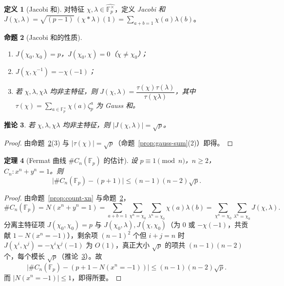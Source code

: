 \documentclass{article}
\theoremstyle{plain}
\newtheorem{thm}{定理}[section]
\newtheorem{cor}[thm]{推论}
\newtheorem{prop}[thm]{命题}
\theoremstyle{definition}
\newtheorem{defn}[thm]{定义}
\theoremstyle{remark}
\begin{document}
\begin{defn}[Jacobi 和]
  对特征 $\chi,\lambda\in\widehat{\mathbb{F}_p^\times}$，定义 \emph{Jacobi 和} $J(\chi,\lambda)=\sqrt{(p-1)}\,(\chi*\lambda)(1)=\sum_{a+b=1}\chi(a)\lambda(b)$。
\end{defn}

\begin{prop}[Jacobi 和的性质]\label{prop:jacobi}
  \begin{enumerate}[(1)]
    \item $J(\chi_0,\chi_0)=p$，$J(\chi_0,\chi)=0$（$\chi\ne\chi_0$）；
    \item $J(\chi,\chi^{-1})=-\chi(-1)$；
    \item 若 $\chi,\lambda,\chi\lambda$ 均非主特征，则 $J(\chi,\lambda)=\dfrac{\tau(\chi)\tau(\lambda)}{\tau(\chi\lambda)}$，其中 $\tau(\chi)=\sum_{a\in\mathbb{F}_p^\times}\chi(a)\zeta_p^a$ 为 Gauss 和。
  \end{enumerate}
\end{prop}

\begin{cor}\label{cor:jacobi-mod}
  若 $\chi,\lambda,\chi\lambda$ 均非主特征，则 $|J(\chi,\lambda)|=\sqrt p$。
\end{cor}

\begin{proof}
  由命题~\ref{prop:jacobi}(3) 与 $|\tau(\chi)|=\sqrt p$（命题~\ref{prop:gauss-sum}(2)）即得。
\end{proof}

\begin{thm}[Fermat 曲线 $\#\!C_n(\mathbb{F}_p)$ 的估计]\label{thm:fermat-fp}
  设 $p\equiv1\pmod n$，$n\ge2$，$C_n:x^n+y^n=1$。则
  \[
    \bigl|\#C_n(\mathbb{F}_p)-(p+1)\bigr|\le(n-1)(n-2)\sqrt p.
  \]
\end{thm}

\begin{proof}
  由命题~\ref{prop:count-xn} 与命题~\ref{prop:jacobi}，
  \[
    \#C_n(\mathbb{F}_p)=N(x^n+y^n=1)=\sum_{a+b=1}\sum_{\chi^n=\chi_0}\sum_{\lambda^n=\chi_0}\chi(a)\lambda(b)
    =\sum_{\chi^n=\chi_0}\sum_{\lambda^n=\chi_0}J(\chi,\lambda).
  \]
  分离主特征项 $J(\chi_0,\chi_0)=p$ 与 $J(\chi_0,\lambda),J(\chi,\chi_0)$（为 $0$ 或 $-\chi(-1)$，共贡献 $1-N(x^n=-1)$），剩余项 $(n-1)^2$ 个但 $i+j=n$ 时 $J(\chi^i,\chi^j)=-\chi^i\chi^j(-1)$ 为 $O(1)$，真正大小 $\sqrt p$ 的项共 $(n-1)(n-2)$ 个，每个模长 $\sqrt p$（推论~\ref{cor:jacobi-mod}）。故
  \[
    \bigl|\#C_n(\mathbb{F}_p)-(p+1-N(x^n=-1))\bigr|\le(n-1)(n-2)\sqrt p.
  \]
  而 $|N(x^n=-1)|\le1$，即得所要。
\end{proof}
\end{document}
